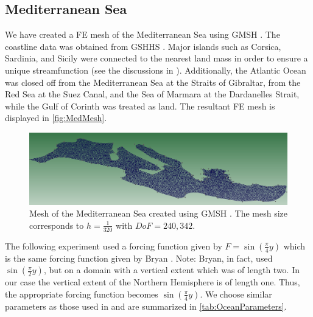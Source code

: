 \subsection*{Mediterranean Sea}
We have created a FE mesh of the Mediterranean Sea using GMSH \cite{GMSH}.  The
coastline data was obtained from GSHHS \cite{GSHHS}. Major islands such as
Corsica, Sardinia, and Sicily were connected to the nearest land mass in order
to ensure a unique streamfunction (see the discussions in
\cite{Gunzburger89,van-Gijzen1998}).  Additionally, the Atlantic Ocean was
closed off from the Mediterranean Sea at the Straits of Gibraltar, from the Red
Sea at the Suez Canal, and the Sea of Marmara at the Dardanelles Strait, while
the Gulf of Corinth was treated as land. The resultant FE mesh is displayed in
\autoref{fig:MedMesh}.

\begin{figure}
  \begin{center}
    \includegraphics[scale=0.4]{Figures/MediterraneanMesh.png}
    \caption{Mesh of the Mediterranean Sea created using GMSH \cite{GMSH}. The
    mesh size corresponds to $h=\frac{1}{320}$ with $DoF=240,342$.}
    \label{fig:MedMesh}
  \end{center}
\end{figure}

The following experiment used a forcing function given by $F =
\sin\left(\frac{\pi}{4} y\right)$ which is the same forcing function given by Bryan
\cite{Bryan1963}. Note: Bryan, in fact, used $\sin(\frac{\pi}{2} y)$, but on a
domain with a vertical extent which was of length two. In our case the vertical
extent of the Northern Hemisphere is of length one. Thus, the appropriate forcing
function becomes $\sin(\frac{\pi}{4} y)$. We choose similar parameters as those
used in \cite{delSastre04} and are summarized in \autoref{tab:OceanParameters}.

